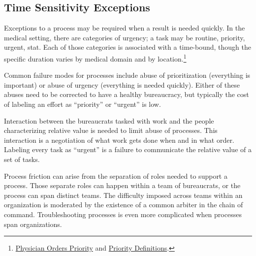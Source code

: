 \subsection*{Time Sensitivity Exceptions}
Exceptions to a process may be required when a result is needed quickly. In the medical setting, there are categories of urgency; a task may be routine, priority, urgent, stat. 
Each of those categories is associated with a time-bound, though the specific duration varies by medical domain and by location.\footnote{\href{http://docport.columbia-stmarys.org/EHR/PhysicianOrdersPriorityandDeptServiceHours.aspx}{Physician Orders Priority}\iftoggle{printedonpaper}{ on http://docport.columbia-stmarys.org}{} and \href{https://www.unitypoint.org/peoria/services-priority-definitions-and-critical-values.aspx}{Priority Definitions}\iftoggle{printedonpaper}{ from https://www.unitypoint.org}{}.}

Common failure modes for processes include abuse of prioritization (everything is important) or abuse of urgency (everything is needed quickly). Either of these abuses need to be corrected to have a healthy bureaucracy, but typically the cost of labeling an effort as ``priority'' or ``urgent'' is low. 

Interaction between the bureaucrats tasked with work and the people characterizing relative value is needed to limit abuse of processes. This interaction is a negotiation of what work gets done when and in what order. Labeling every task as ``urgent'' is a failure to communicate the relative value of a set of tasks.


Process friction can arise from the separation of roles needed to support a process. Those separate roles can happen within a team of bureaucrats, or the process can span distinct teams. The difficulty imposed across teams within an organization is moderated by the existence of a common arbiter in the chain of command.  
Troubleshooting processes is even more complicated when processes span organizations.  